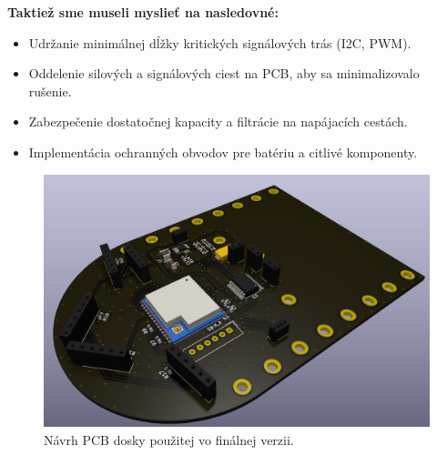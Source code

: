 \textbf{Taktiež sme museli myslieť na nasledovné:}
\begin{itemize}
	\item Udržanie minimálnej dĺžky kritických signálových trás (I2C, PWM).
	\item Oddelenie silových a signálových ciest na PCB, aby sa minimalizovalo rušenie.
	\item Zabezpečenie dostatočnej kapacity a filtrácie na napájacích cestách.
	\item Implementácia ochranných obvodov pre batériu a citlivé komponenty.
\end{itemize}

\begin{figure}[!htpb]
	\centering
	\includegraphics[width=1\linewidth]{includes//images/PCB.png}
	\caption{Návrh PCB dosky použitej vo finálnej verzii.}
	\label{fig:PCB}
\end{figure}

